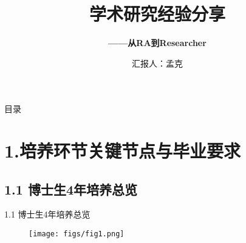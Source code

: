 \documentclass[10pt,aspectratio=43,mathserif,table]{beamer}
\title{学术研究经验分享}
\subtitle{\fontsize{9pt}{14pt}\textbf{——从RA到Researcher}}
\author{汇报人：孟克}
\institute{\fontsize{8pt}{14pt}对外经济贸易大学中国WTO研究院}
\date{\fontsize{6pt}{10pt}{2024.9.13}}
\begin{document}

\frame{\titlepage}

\section[目录]{}   %
\begin{frame}{目录}
\tableofcontents
\end{frame}

\section{1.培养环节关键节点与毕业要求}  %

\subsection{1.1 博士生4年培养总览}
\begin{frame}{\small 1.1 博士生4年培养总览}
	\begin{figure}[htbp]
		\centering
		\texttt{[image: figs/fig1.png]}
		\label{fig:indicator}
	\end{figure}
\end{frame}
\end{document}
